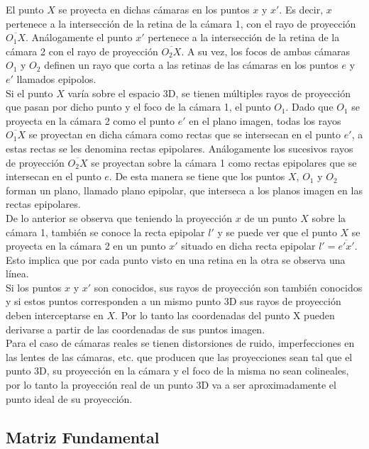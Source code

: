   El punto $X$ se proyecta en dichas cámaras en los puntos $x$ y $x'$. Es decir, $x$ pertenece a la intersección de la retina de la cámara 1, con el rayo de proyección $\overline{O_1X}$. Análogamente el punto $x'$ pertenece a la intersección de la retina de la cámara 2 con el rayo de proyección $\overline{O_2X}$. A su vez, los focos de ambas cámaras $O_1$ y $O_2$ definen un rayo que corta a las retinas de las cámaras en los puntos $e$ y $e'$ llamados epipolos.\\
  
  Si el punto $X$ varía sobre el espacio 3D, se tienen múltiples rayos de proyección que pasan por dicho punto y el foco de la cámara 1, el punto $O_1$. Dado que $O_1$ se proyecta en la cámara 2 como el punto $e'$ en el plano imagen, todas los rayos  $\overline{O_1X}$ se proyectan en dicha cámara como rectas que se intersecan en el punto $e'$, a estas rectas se les denomina rectas epipolares. Análogamente los sucesivos rayos de proyección $\overline{O_2X}$ se proyectan sobre la cámara 1 como rectas epipolares que se intersecan en el punto $e$. De esta manera se tiene que los puntos $X$, $O_1$ y $O_2$ forman un plano, llamado plano epipolar,  que interseca a los planos imagen en las rectas epipolares.\\
  
De lo anterior se observa que teniendo la proyección $x$ de un punto $X$ sobre la cámara 1, también se conoce la recta epipolar $l'$ y se puede ver que el punto $X$ se proyecta en la cámara 2 en un punto $x'$ situado en dicha recta epipolar $l'=\overline{e'x'}$. Esto implica que por cada punto visto en una retina en la otra se observa una línea.\\
 
Si los puntos $x$ y $x'$ son conocidos, sus rayos de proyección son también conocidos y si estos puntos corresponden a un mismo punto 3D sus rayos de proyección deben interceptarse en $X$. Por lo tanto las coordenadas del punto X pueden derivarse a partir de las coordenadas de sus puntos imagen.\\
 
Para el caso de cámaras reales se tienen distorsiones de ruido, imperfecciones en las lentes de las cámaras, etc. que producen que las proyecciones sean tal que el punto 3D, su proyección en la cámara y el foco de la misma no sean colineales, por lo tanto la proyección real de un punto 3D va a ser aproximadamente el punto ideal de su proyección. \\

\subsection{Matriz Fundamental}

